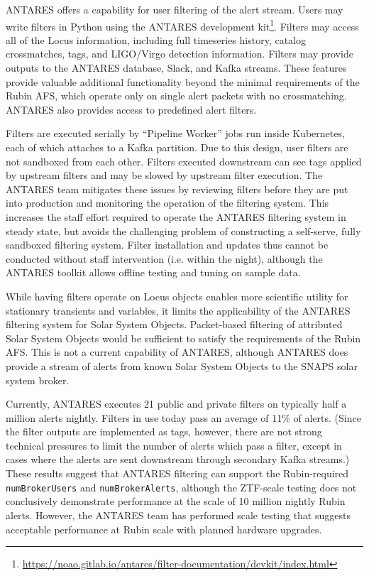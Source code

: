 \documentclass[DM,authoryear,toc]{lsstdoc}
\begin{document}
ANTARES offers a capability for user filtering of the alert stream.
Users may write filters in Python using the ANTARES development kit\footnote{\url{https://noao.gitlab.io/antares/filter-documentation/devkit/index.html}}. 
Filters may access all of the Locus information, including full timeseries history, catalog crossmatches, tags, and LIGO/Virgo detection information.
Filters may provide outputs to the ANTARES database, Slack, and Kafka streams.
These features provide valuable additional functionality beyond the minimal requirements of the Rubin AFS, which operate only on single alert packets with no crossmatching.
ANTARES also provides access to predefined alert filters.

Filters are executed serially by ``Pipeline Worker'' jobs run inside Kubernetes, each of which attaches to a Kafka partition.
Due to this design, user filters are not sandboxed from each other.
Filters executed downstream can see tags applied by upstream filters and may be slowed by upstream filter execution.
The ANTARES team mitigates these issues by reviewing filters before they are put into production and monitoring the operation of the filtering system.
This increases the staff effort required to operate the ANTARES filtering system in steady state, but avoids the challenging problem of constructing a self-serve, fully sandboxed filtering system.
Filter installation and updates thus cannot be conducted without staff intervention (i.e. within the night), although the ANTARES toolkit allows offline testing and tuning on sample data.

While having filters operate on Locus objects enables more scientific utility for stationary transients and variables, it limits the applicability of the ANTARES filtering system for Solar System Objects.
Packet-based filtering of attributed Solar System Objects would be sufficient to satisfy the requirements of the Rubin AFS.
This is not a current capability of ANTARES, although ANTARES does provide a stream of alerts from known Solar System Objects to the SNAPS solar system broker.

Currently, ANTARES executes 21 public and private filters on typically half a million alerts nightly.
Filters in use today pass an average of 11\% of alerts.
(Since the filter outputs are implemented as tags, however, there are not strong technical pressures to limit the number of alerts which pass a filter, except in cases where the alerts are sent downstream through secondary Kafka streams.)
These results suggest that ANTARES filtering can support the Rubin-required \texttt{numBrokerUsers} and \texttt{numBrokerAlerts}, although the ZTF-scale testing does not conclusively demonstrate performance at the scale of 10 million nightly Rubin alerts.
However, the ANTARES team has performed scale testing that suggests acceptable performance at Rubin scale with planned hardware upgrades.
\end{document}
